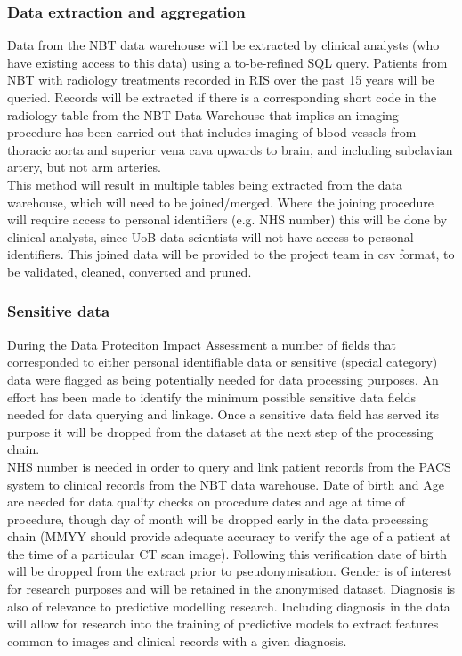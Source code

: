 \documentclass{article}
\begin{document}
\subsubsection{Data extraction and aggregation}

Data from the NBT data warehouse will be extracted by clinical
analysts (who have existing access to this data) using a to-be-refined
SQL query. Patients from NBT with radiology treatments recorded in RIS over the past 15 years will be queried. Records will be extracted if there is a corresponding short code in the radiology table from the NBT Data Warehouse that implies an imaging procedure has been carried out that includes imaging of blood vessels from thoracic aorta and superior vena cava upwards to brain, and including subclavian artery, but not arm arteries.\\

This method will result in multiple tables being extracted
from the data warehouse, which will need to be joined/merged. Where
the joining procedure will require access to personal identifiers
(e.g. NHS number) this will be done by clinical analysts, since UoB
data scientists will not have access to personal identifiers. This
joined data will be provided to the project team in csv format, to be
validated, cleaned, converted and pruned.

\subsubsection{Sensitive data}

During the Data Proteciton Impact Assessment a number of fields that
corresponded to either personal
identifiable data or sensitive (special category) data were flagged as being potentially needed for data
processing purposes. An effort has been made to identify the minimum possible sensitive
data fields needed for data querying and linkage. Once a sensitive
data field has served its purpose it will be dropped from the dataset
at the next step of the processing chain. \\

NHS number is needed in
order to query and link patient records from the PACS system to
clinical records from the NBT data warehouse.
Date of birth and Age are needed for data quality checks on procedure
dates and age at time of procedure, though day of month will be
dropped early in the data processing chain (MMYY should provide
adequate accuracy to verify the age of a patient at the time of a
particular CT scan image). Following this verification date of birth
will be dropped from the extract prior to pseudonymisation.
Gender is of interest for research purposes and will be
retained in the anonymised dataset.  Diagnosis is also of relevance to
predictive modelling research. Including diagnosis in the data will
allow for research into the training of predictive models to extract
features common to images and clinical records with a given diagnosis.
\end{document}
